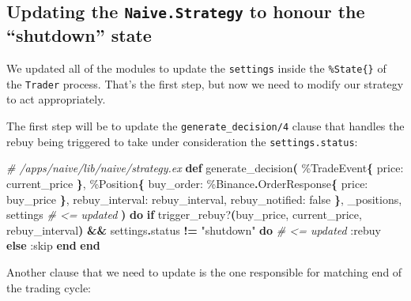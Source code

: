 \documentclass[
  oneside]{book}
\newenvironment{Shaded}{\begin{snugshade}}{\end{snugshade}}
\newcommand{\CommentTok}[1]{\textcolor[rgb]{0.56,0.35,0.01}{\textit{#1}}}
\newcommand{\ConstantTok}[1]{\textcolor[rgb]{0.56,0.35,0.01}{#1}}
\newcommand{\ControlFlowTok}[1]{\textcolor[rgb]{0.13,0.29,0.53}{\textbf{#1}}}
\newcommand{\FunctionTok}[1]{\textcolor[rgb]{0.13,0.29,0.53}{\textbf{#1}}}
\newcommand{\KeywordTok}[1]{\textcolor[rgb]{0.13,0.29,0.53}{\textbf{#1}}}
\newcommand{\NormalTok}[1]{#1}
\newcommand{\OperatorTok}[1]{\textcolor[rgb]{0.81,0.36,0.00}{\textbf{#1}}}
\newcommand{\StringTok}[1]{\textcolor[rgb]{0.31,0.60,0.02}{#1}}
\newcommand{\VariableTok}[1]{\textcolor[rgb]{0.00,0.00,0.00}{#1}}
\begin{document}
\subsection{\texorpdfstring{Updating the \texttt{Naive.Strategy} to honour the ``shutdown'' state}{Updating the Naive.Strategy to honour the ``shutdown'' state}}\label{updating-the-naive.strategy-to-honour-the-shutdown-state}

We updated all of the modules to update the \texttt{settings} inside the \texttt{\%State\{\}} of the \texttt{Trader} process. That's the first step, but now we need to modify our strategy to act appropriately.

The first step will be to update the \texttt{generate\_decision/4} clause that handles the rebuy being triggered to take under consideration the \texttt{settings.status}:

\begin{Shaded}
\begin{Highlighting}[]
  \CommentTok{\# /apps/naive/lib/naive/strategy.ex}
  \KeywordTok{def}\NormalTok{ generate\_decision}\FunctionTok{(}
\NormalTok{        \%}\ConstantTok{TradeEvent}\FunctionTok{\{}
          \VariableTok{price:}\NormalTok{ current\_price}
        \FunctionTok{\}}\NormalTok{,}
\NormalTok{        \%}\ConstantTok{Position}\FunctionTok{\{}
          \VariableTok{buy\_order:}\NormalTok{ \%}\ConstantTok{Binance}\OperatorTok{.}\ConstantTok{OrderResponse}\FunctionTok{\{}
            \VariableTok{price:}\NormalTok{ buy\_price}
          \FunctionTok{\}}\NormalTok{,}
          \VariableTok{rebuy\_interval:}\NormalTok{ rebuy\_interval,}
          \VariableTok{rebuy\_notified:} \ConstantTok{false}
        \FunctionTok{\}}\NormalTok{,}
\NormalTok{        \_positions,}
\NormalTok{        settings }\CommentTok{\# \textless{}= updated}
      \FunctionTok{)} \KeywordTok{do}
    \ControlFlowTok{if}\NormalTok{ trigger\_rebuy?}\FunctionTok{(}\NormalTok{buy\_price, current\_price, rebuy\_interval}\FunctionTok{)} \OperatorTok{\&\&}
\NormalTok{         settings}\OperatorTok{.}\NormalTok{status}\OperatorTok{ !=} \StringTok{"shutdown"} \KeywordTok{do} \CommentTok{\# \textless{}= updated}
      \VariableTok{:rebuy}
    \ControlFlowTok{else}
      \VariableTok{:skip}
    \KeywordTok{end}
  \KeywordTok{end}
\end{Highlighting}
\end{Shaded}

Another clause that we need to update is the one responsible for matching end of the trading cycle:
\end{document}
